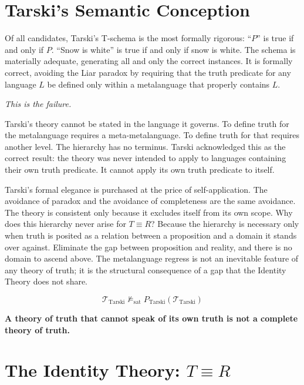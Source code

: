 \documentclass[11pt, oneside]{article}
\newcommand{\isolate}[1]{%
    \vspace{8pt}%
    \begin{center}\itshape #1\end{center}%
    \vspace{8pt}%
}
\newcommand{\verdict}[1]{%
    \vspace{10pt}%
    \begin{center}\textcolor{LogosGold}{\textbf{#1}}\end{center}%
    \vspace{10pt}%
}
\begin{document}
\section{Tarski's Semantic Conception}

Of all candidates, Tarski's T-schema is the most formally rigorous:
``$P$'' is true if and only if $P$. ``Snow is white'' is true if and
only if snow is white. The schema is materially adequate, generating all
and only the correct instances. It is formally correct, avoiding the
Liar paradox by requiring that the truth predicate for any language $L$
be defined only within a metalanguage that properly contains $L$.

\isolate{This is the failure.}

Tarski's theory cannot be stated in the language it governs. To define
truth for the metalanguage requires a meta-metalanguage. To define truth
for that requires another level. The hierarchy has no terminus. Tarski
acknowledged this as the correct result: the theory was never intended
to apply to languages containing their own truth predicate. It cannot
apply its own truth predicate to itself.

Tarski's formal elegance is purchased at the price of self-application.
The avoidance of paradox and the avoidance of completeness are the same
avoidance. The theory is consistent only because it excludes itself from
its own scope. Why does this hierarchy never arise for $T \equiv R$?
Because the hierarchy is necessary only when truth is posited as a
relation between a proposition and a domain it stands over against.
Eliminate the gap between proposition and reality, and there is no domain
to ascend above. The metalanguage regress is not an inevitable feature of
any theory of truth; it is the structural consequence of a gap that the
Identity Theory does not share.

\[
\mathcal{T}_{\mathrm{Tarski}} \not\models_{\mathrm{sat}}
P_{\mathrm{Tarski}}(\mathcal{T}_{\mathrm{Tarski}}) \tag{AC}
\]

\verdict{A theory of truth that cannot speak of its own truth is not a complete theory of truth.}

\section{The Identity Theory: $T \equiv R$}
\end{document}

